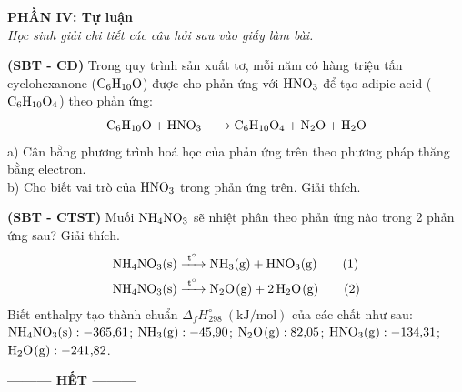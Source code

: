 \documentclass[12pt,a4paper]{article}
\begin{document}
\bigskip
\noindent
\textbf{PHẦN IV: Tự luận}\\
\textit{Học sinh giải chi tiết các câu hỏi sau vào giấy làm bài.}

\begin{ex}
\textbf{(SBT - CD)} Trong quy trình sản xuất tơ, mỗi năm có hàng triệu tấn cyclohexanone ($\ce{C6H10O}$) được cho phản ứng với $\ce{HNO3}$ để tạo adipic acid ($\ce{C6H10O4}$) theo phản ứng:
\[\ce{C6H10O + HNO3 -> C6H10O4 + N2O + H2O}\]
a) Cân bằng phương trình hoá học của phản ứng trên theo phương pháp thăng bằng electron.\\
b) Cho biết vai trò của $\ce{HNO3}$ trong phản ứng trên. Giải thích.

\vspace{2.5cm}

\end{ex}

\begin{ex}
\textbf{(SBT - CTST)} Muối $\ce{NH4NO3}$ sẽ nhiệt phân theo phản ứng nào trong 2 phản ứng sau? Giải thích.
\begin{align*}
	\ce{NH4NO3(s) &->[t^\circ] NH3(g) + HNO3(g)} \tag{1} \\
	\ce{NH4NO3(s) &->[t^\circ] N2O(g) + 2H2O(g)} \tag{2}
\end{align*}
Biết enthalpy tạo thành chuẩn $\Delta_f H^\circ_{298}\ (\text{kJ/mol})$ của các chất như sau:
$\ce{NH4NO3(s)}: -365{,}61$; $\ce{NH3(g)}: -45{,}90$; $\ce{N2O(g)}: 82{,}05$; $\ce{HNO3(g)}: -134{,}31$; $\ce{H2O(g)}: -241{,}82$.

\vspace{3.5cm}

\end{ex}

\begin{center}
\textbf{--------- HẾT ---------}
\end{center}
\end{document}
